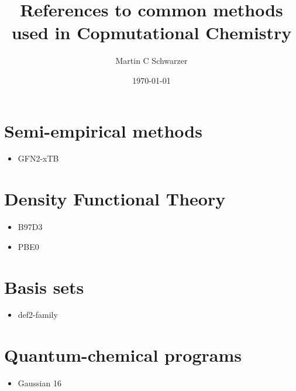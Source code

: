\documentclass[   %
  final,          %
  a4paper,        %
  8pt
]{extarticle}
\title{References to common methods used in Copmutational Chemistry}
\author{Martin C Schwarzer}
\date{\today}
\begin{document}
\section{Semi-empirical methods}
\begin{itemize}
  \item GFN2-xTB\autocite{gfn2xtb}
\end{itemize}

\section{Density Functional Theory}
\begin{itemize}
  \item B97D3\autocite{Grimme2011}
  \item PBE0\autocite{pbe0}
\end{itemize}

\section{Basis sets}
\begin{itemize}
  \item def2-family\autocite{def2}
\end{itemize}

\section{Quantum-chemical programs}
\begin{itemize}
  \item Gaussian 16\autocite{g16}
\end{itemize}

\nocite{*}
\printbibliography
\end{document}
